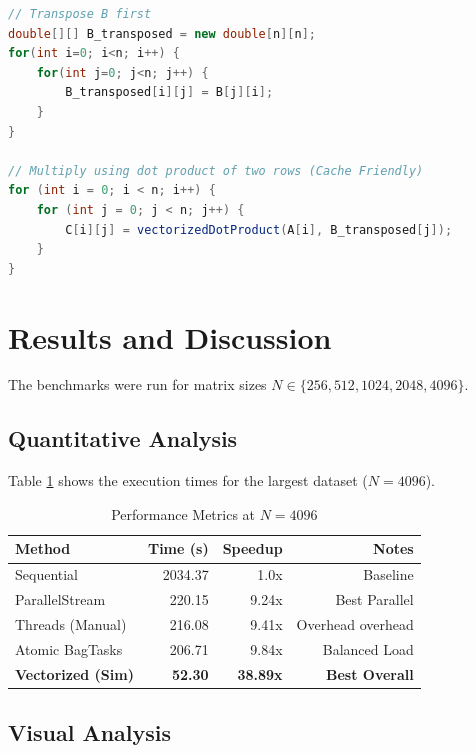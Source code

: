 \documentclass[a4paper,12pt]{article}
\begin{document}
\begin{lstlisting}[language=Java, caption={Vectorized (Transposed) Implementation}]
// Transpose B first
double[][] B_transposed = new double[n][n];
for(int i=0; i<n; i++) {
    for(int j=0; j<n; j++) {
        B_transposed[i][j] = B[j][i];
    }
}

// Multiply using dot product of two rows (Cache Friendly)
for (int i = 0; i < n; i++) {
    for (int j = 0; j < n; j++) {
        C[i][j] = vectorizedDotProduct(A[i], B_transposed[j]);
    }
}
\end{lstlisting}

\section{Results and Discussion}

The benchmarks were run for matrix sizes $N \in \{256, 512, 1024, 2048, 4096\}$.

\subsection{Quantitative Analysis}

Table \ref{tab:results} shows the execution times for the largest dataset ($N=4096$).

\begin{table}[H]
\centering
\caption{Performance Metrics at $N=4096$}
\label{tab:results}
\begin{tabular}{lrrr}
\toprule
\textbf{Method} & \textbf{Time (s)} & \textbf{Speedup} & \textbf{Notes} \\
\midrule
Sequential & 2034.37 & 1.0x & Baseline \\
ParallelStream & 220.15 & 9.24x & Best Parallel \\
Threads (Manual) & 216.08 & 9.41x & Overhead overhead \\
Atomic BagTasks & 206.71 & 9.84x & Balanced Load \\
\textbf{Vectorized (Sim)} & \textbf{52.30} & \textbf{38.89x} & \textbf{Best Overall} \\
\bottomrule
\end{tabular}
\end{table}

\subsection{Visual Analysis}
\end{document}
